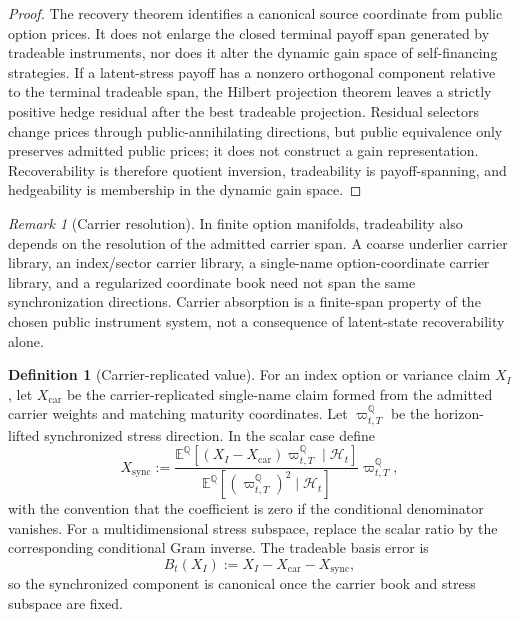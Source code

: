 \documentclass[11pt,a4paper]{amsart}
\theoremstyle{plain}
\theoremstyle{definition}
\newtheorem{definition}[theorem]{Definition}
\theoremstyle{remark}
\newtheorem{remark}[theorem]{Remark}
\newcommand{\QQ}{\mathbb{Q}}
\newcommand{\EE}{\mathbb{E}}
\newcommand{\cH}{\mathcal{H}}
\begin{document}
\begin{proof}
The recovery theorem identifies a canonical source coordinate from public option prices.  It does
not enlarge the closed terminal payoff span generated by tradeable instruments, nor does it alter
the dynamic gain space of self-financing strategies.  If a latent-stress payoff has a nonzero
orthogonal component relative to the terminal tradeable span, the Hilbert projection theorem leaves
a strictly positive hedge residual after the best tradeable projection.  Residual selectors change
prices through public-annihilating directions, but public equivalence only preserves admitted
public prices; it does not construct a gain representation.  Recoverability is therefore quotient
inversion, tradeability is payoff-spanning, and hedgeability is membership in the dynamic gain
space.
\end{proof}

\begin{remark}[Carrier resolution]\label{rem:carrier-resolution}
In finite option manifolds, tradeability also depends on the resolution of the admitted carrier
span.  A coarse underlier carrier library, an index/sector carrier library, a single-name
option-coordinate carrier library, and a regularized coordinate book need not span the same
synchronization directions.  Carrier absorption is a finite-span property of the chosen public
instrument system, not a consequence of latent-state recoverability alone.
\end{remark}

\begin{definition}[Carrier-replicated value]\label{def:carrier-replicated-value}
For an index option or variance claim \(X_I\), let \(X_{\mathrm{car}}\) be the carrier-replicated
single-name claim formed from the admitted carrier weights and matching maturity coordinates.  Let
\(\varpi_{t,T}^\QQ\) be the horizon-lifted synchronized stress direction.  In the scalar case define
\[
        X_{\mathrm{sync}}
        :=
        \frac{
        \EE^\QQ[(X_I-X_{\mathrm{car}})\varpi_{t,T}^\QQ\mid\cH_t]
        }{
        \EE^\QQ[(\varpi_{t,T}^\QQ)^2\mid\cH_t]
        }
        \varpi_{t,T}^\QQ,
\]
with the convention that the coefficient is zero if the conditional denominator vanishes.  For a
multidimensional stress subspace, replace the scalar ratio by the corresponding conditional Gram
inverse.  The tradeable basis error is
\[
        B_t(X_I):=
        X_I-X_{\mathrm{car}}-X_{\mathrm{sync}},
\]
so the synchronized component is canonical once the carrier book and stress subspace are fixed.
\end{definition}
\end{document}

